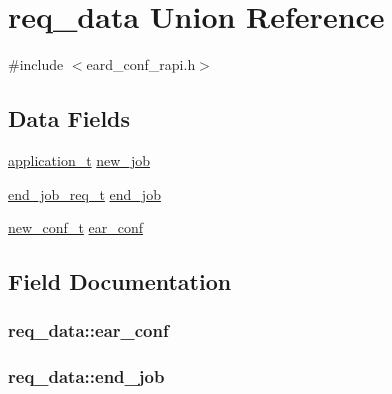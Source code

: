 \hypertarget{unionreq__data}{}\section{req\+\_\+data Union Reference}
\label{unionreq__data}


{\ttfamily \#include $<$eard\+\_\+conf\+\_\+rapi.\+h$>$}

\subsection*{Data Fields}
\begin{DoxyCompactItemize}
\item 
\hyperlink{application_8h_af0a524c43fc5f548021099181df194bf}{application\+\_\+t} \hyperlink{unionreq__data_acd61e6ce769ca1d6b24bc2ae5ed20807}{new\+\_\+job}
\item 
\hyperlink{eard__conf__rapi_8h_a1050f22579e2b4b2c11ccce04944204d}{end\+\_\+job\+\_\+req\+\_\+t} \hyperlink{unionreq__data_abe5daeb2d91cc59e2444fd77a4236114}{end\+\_\+job}
\item 
\hyperlink{eard__conf__rapi_8h_a87862a31ffa17057e71b2505316ecd7c}{new\+\_\+conf\+\_\+t} \hyperlink{unionreq__data_a2d027499a06e790076c713298fc189f4}{ear\+\_\+conf}
\end{DoxyCompactItemize}


\subsection{Field Documentation}
\subsubsection[{\texorpdfstring{ear\+\_\+conf}{ear_conf}}]{ req\+\_\+data\+::ear\+\_\+conf}\hypertarget{unionreq__data_a2d027499a06e790076c713298fc189f4}{}\label{unionreq__data_a2d027499a06e790076c713298fc189f4}
\subsubsection[{\texorpdfstring{end\+\_\+job}{end_job}}]{ req\+\_\+data\+::end\+\_\+job}\hypertarget{unionreq__data_abe5daeb2d91cc59e2444fd77a4236114}{}\label{unionreq__data_abe5daeb2d91cc59e2444fd77a4236114}
